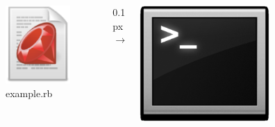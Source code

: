 \documentclass{beamer}
\begin{document}
\begin{frame}
\begin{itemize}
      \begin{columns}
        \begin{column}{3cm}
          \includegraphics[width=0.7\textwidth]{img/ruby_file.eps} \\
          \hspace*{0.1cm}
          example.rb
        \end{column}
        \begin{column}{0.1px}
          $\rightarrow$
        \end{column}
        \begin{column}{4cm}
          \hspace*{0.8cm}
          \begin{center}
            \includegraphics[width=0.6\textwidth]{img/terminal_icon.eps} \\

\end{center}
\end{column}
\end{columns}
\end{itemize}
\end{frame}
\end{document}
